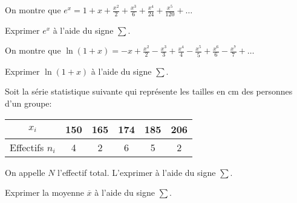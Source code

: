 \documentclass[a4paper,12pt]{scrartcl}
\begin{document}
\question{}
On montre que $e^x = 1 + x + \frac{x^2}{2} + \frac{x^3}{6} + \frac{x^4}{24} + \frac{x^5}{120} + \ldots$

Exprimer $e^x$ à l'aide du signe $\sum$.

\question{}
On montre que $\ln(1+x) = -x + \frac{x^2}{2} - \frac{x^3}{3} + \frac{x^4}{4} - \frac{x^5}{5} + \frac{x^6}{6} - \frac{x^7}{7} + \ldots$

Exprimer $\ln(1+x)$ à l'aide du signe $\sum$.


\exo{}
Soit la série statistique suivante qui représente les tailles en cm des personnes d'un groupe:

\begin{center}
\begin{tabular}{|c|c|c|c|c|c|}
\hline 
$x_i$ & 150 & 165 & 174 & 185 & 206 \\ 
\hline 
Effectifs $n_i$ & 4 & 2 & 6 & 5 & 2 \\ 
\hline 
\end{tabular} 
\end{center}

\question{}
On appelle $N$ l'effectif total. L'exprimer à l'aide du signe $\sum$.

\question{}
Exprimer la moyenne $\overline{x}$ à l'aide du signe $\sum$.
\end{document}
